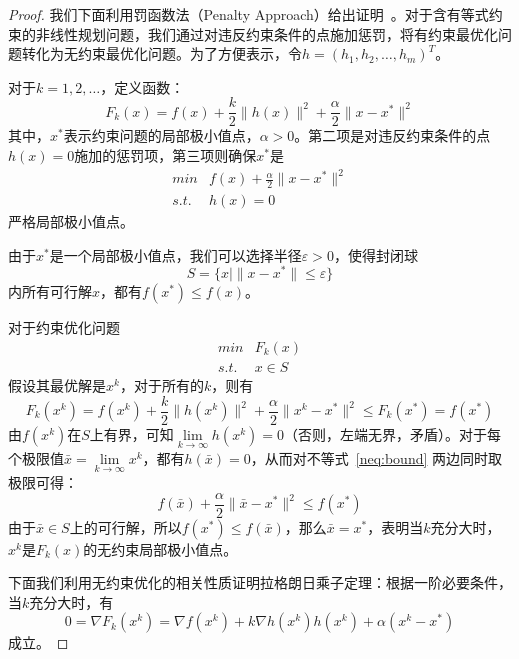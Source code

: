 \begin{proof}
我们下面利用罚函数法（Penalty Approach）给出证明~\cite{bertsekas1999nonlinear}。对于含有等式约束的非线性规划问题，我们通过对违反约束条件的点施加惩罚，将有约束最优化问题转化为无约束最优化问题。为了方便表示，令$h=(h_1,h_2,\ldots,h_m)^T$。

对于$k=1,2,\ldots$，定义函数：
\begin{equation}
    F_k(x) = f(x) + \frac{k}{2} \|h(x)\|^2 + \frac{\alpha}{2} \|x-x^*\|^2
\end{equation}
其中，$x^*$表示约束问题的局部极小值点，$\alpha>0$。第二项是对违反约束条件的点$h(x)=0$施加的惩罚项，第三项则确保$x^*$是
\[
    \begin{array}{ll}
      \textit{min} & f(x) +  \frac{\alpha}{2} \|x-x^*\|^2 \\
      \textit{s.t.} & h(x) = 0
    \end{array}
\]
严格局部极小值点。

由于$x^*$是一个局部极小值点，我们可以选择半径$\varepsilon>0$，使得封闭球
\begin{equation}
    S = \{x\mid \|x-x^*\| \le \varepsilon\}
\end{equation}
内所有可行解$x$，都有$f(x^*) \le f(x)$。

对于约束优化问题
\begin{equation}\label{eq:constainedlagrange}
    \begin{array}{ll}
      \textit{min} & F_k(x) \\
      \textit{s.t.} & x\in S
    \end{array}
\end{equation}
假设其最优解是$x^k$，对于所有的$k$，则有
\begin{equation}\label{neq:bound}
    F_k(x^k) = f(x^k) +  \frac{k}{2} \|h(x^k)\|^2 + \frac{\alpha}{2} \|x^k-x^*\|^2 \le F_k(x^*) = f(x^*)
\end{equation}
由$f(x^k)$在$S$上有界，可知$\lim\limits_{k\rightarrow \infty} h(x^k) = 0$（否则，左端无界，矛盾）。对于每个极限值$\bar{x} = \lim\limits_{k\rightarrow \infty} x^k$，都有$h(\bar{x}) = 0$，从而对不等式~\ref{neq:bound} 两边同时取极限可得：
\begin{equation}
    f(\bar{x}) + \frac{\alpha}{2} \|\bar{x}-x^*\|^2 \le f(x^*)
\end{equation}
由于$\bar{x}\in S$上的可行解，所以$f(x^*) \le f(\bar{x})$，那么$\bar{x} = x^*$，表明当$k$充分大时，$x^k$是$F_k(x)$的无约束局部极小值点。

下面我们利用无约束优化的相关性质证明拉格朗日乘子定理：根据一阶必要条件，当$k$充分大时，有
\begin{equation}\label{eq:lagrangenecessary}
    0 = \nabla F_k(x^k) = \nabla f(x^k) + k \nabla h(x^k) h(x^k) + \alpha (x^k - x^*)
\end{equation}
成立。


\end{proof}
